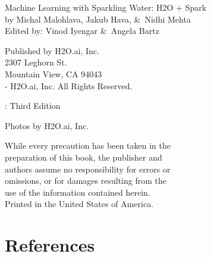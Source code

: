     {\raggedright\vfill

    Machine Learning with Sparkling Water: H2O + Spark\\
    by Michal Malohlava, Jakub Hava, \&\ Nidhi Mehta\\
    Edited by: Vinod Iyengar \&\ Angela Bartz

    \bigskip
    Published by H2O.ai, Inc. \\
    2307 Leghorn St. \\
    Mountain View, CA 94043\\
    \bigskip
    -\the\year \hspace{1pt} H2O.ai, Inc. All Rights Reserved.
    \bigskip

    \monthname \hspace{1pt}  \the\year: Third Edition
    \bigskip

    Photos by \textcopyright H2O.ai, Inc.
    \bigskip

    While every precaution has been taken in the\\
    preparation of this book, the publisher and\\
    authors assume no responsibility for errors or\\
    omissions, or for damages resulting from the\\
    use of the information contained herein.\\
    \bigskip
    Printed in the United States of America.


    }\par

    \newpage
    \tableofcontents

    \newpage
    

    \newpage
    

    \newpage
    

    \newpage
    

    \newpage
    

    \newpage
    

    \newpage
    

    \newpage
    

    \newpage
    

    \newpage
    

    \newpage
    

    \newpage


    \section{References}

    


